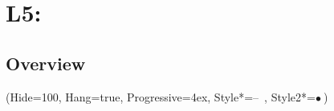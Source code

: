 \documentclass[11pt, oneside]{article}
\begin{document}
\section{L5:}
\subsection{Overview}
    \begin{easylist}  
    \ListProperties(Hide=100, Hang=true, Progressive=4ex, Style*=--\ , Style2*=$\bullet\ $)
        
    \end{easylist}
\clearpage
\end{document}
